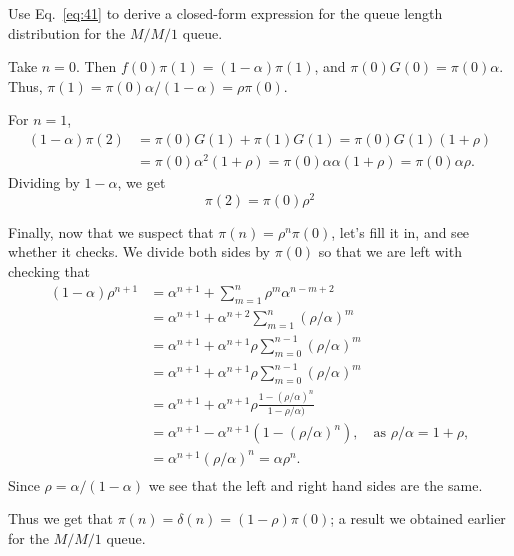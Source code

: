 \begin{question}
  Use Eq.~\eqref{eq:41} to derive a closed-form expression for the
  queue length distribution for the $M/M/1$ queue.  

    \begin{solution}
      Take $n=0$. Then $f(0) \pi(1) = (1-\alpha)\pi(1)$, and
      $\pi(0)G(0) = \pi(0)\alpha$. Thus,
      $\pi(1) = \pi(0)\alpha/(1-\alpha) = \rho \pi(0)$. 

For $n=1$,
\begin{equation*}
  \begin{split}
  (1-\alpha)  \pi(2) 
&= \pi(0)G(1) + \pi(1)G(1) = \pi(0)G(1)(1+\rho) \\
&= \pi(0)\alpha^2(1+\rho) = \pi(0)\alpha \alpha (1+\rho) = \pi(0)\alpha \rho.
  \end{split}
\end{equation*}
Dividing by $1-\alpha$, we get
\begin{equation*}
  \pi(2) = \pi(0)\rho^2
\end{equation*}

Finally, now that we suspect that $\pi(n) = \rho^n \pi(0)$, let's fill
it in, and see whether it checks. We divide both sides by $\pi(0)$ so
that we are left with checking that
\begin{equation*}
  \begin{split}
    (1-\alpha)\rho^{n+1} 
&= \alpha^{n+1} + \sum_{m=1}^n \rho^m \alpha^{n-m+2}  \\
&= \alpha^{n+1} + \alpha^{n+2}\sum_{m=1}^n (\rho/\alpha)^m  \\
&= \alpha^{n+1} + \alpha^{n+1}\rho \sum_{m=0}^{n-1} (\rho/\alpha)^m \\
&= \alpha^{n+1} + \alpha^{n+1}\rho \sum_{m=0}^{n-1} (\rho/\alpha)^m\\
&= \alpha^{n+1} + \alpha^{n+1}\rho \frac{1-(\rho/\alpha)^n}{1-\rho/\alpha)}\\
&= \alpha^{n+1} - \alpha^{n+1}(1-(\rho/\alpha)^n), \quad\text{as } \rho/\alpha = 1+\rho,\\
&= \alpha^{n+1}(\rho/\alpha)^n = \alpha \rho^n.\\
  \end{split}
\end{equation*}
Since $\rho=\alpha/(1-\alpha)$ we see that the left and right hand sides are the same. 

Thus we get that $\pi(n) = \delta(n) = (1-\rho) \pi(0)$; a result we
obtained earlier for the $M/M/1$ queue.
\end{solution}
\end{question}


